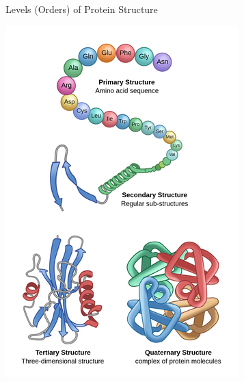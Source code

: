 \begin{frame}{Levels (Orders) of Protein Structure}
	\vspace{-0.5em}
	\begin{center}
		\includegraphics[trim={0 0 0 2em},clip,scale=0.46]{images/protein_structure_levels.png}
	\end{center}
	\vspace{-1.5em}
\end{frame}

